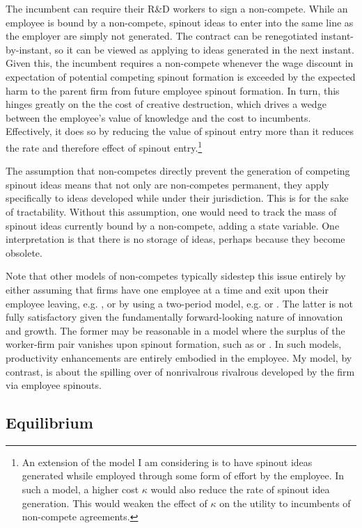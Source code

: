 \documentclass[11pt,english]{article}
\theoremstyle{remark}
\begin{document}
The incumbent can require their R\&D workers to sign a non-compete. While an employee is bound by a non-compete, spinout ideas to enter into the same line as the employer are simply not generated. The contract can be renegotiated instant-by-instant, so it can be viewed as applying to ideas generated in the next instant. Given this, the incumbent requires a non-compete whenever the wage discount in expectation of potential competing spinout formation is exceeded by the expected harm to the parent firm from future employee spinout formation. In turn, this hinges greatly on the the cost of creative destruction, which drives a wedge between the employee's value of knowledge and the cost to incumbents. Effectively, it does so by reducing the value of spinout entry more than it reduces the rate and therefore effect of spinout entry.\footnote{An extension of the model I am considering is to have spinout ideas generated whsile employed through some form of effort by the employee. In such a model, a higher cost $\kappa$ would also reduce the rate of spinout idea generation. This would weaken the effect of $\kappa$ on the utility to incumbents of non-compete agreements.}

The assumption that non-competes directly prevent the generation of competing spinout ideas means that not only are non-competes permanent, they apply specifically to ideas developed while under their jurisdiction. This is for the sake of tractability. Without this assumption, one would need to track the mass of spinout ideas currently bound by a non-compete, adding a state variable. One interpretation is that there is no storage of ideas, perhaps because they become obsolete. 

Note that other models of non-competes typically sidestep this issue entirely by either assuming that firms have one employee at a time and exit upon their employee leaving, e.g. \cite{shi_restrictions_2018}, or by using a two-period model, e.g. \cite{franco_spin-outs:_2006} or \cite{franco_covenants_2008}. The latter is not fully satisfactory given the fundamentally forward-looking nature of innovation and growth. The former may be reasonable in a model where the surplus of the worker-firm pair vanishes upon spinout formation, such as \cite{shi_restrictions_2018} or \cite{baslandze_spinout_2019}. In such models, productivity enhancements are entirely embodied in the employee. My model, by contrast, is about the spilling over of nonrivalrous rivalrous developed by the firm via employee spinouts. 

\subsection{Equilibrium}
\end{document}

